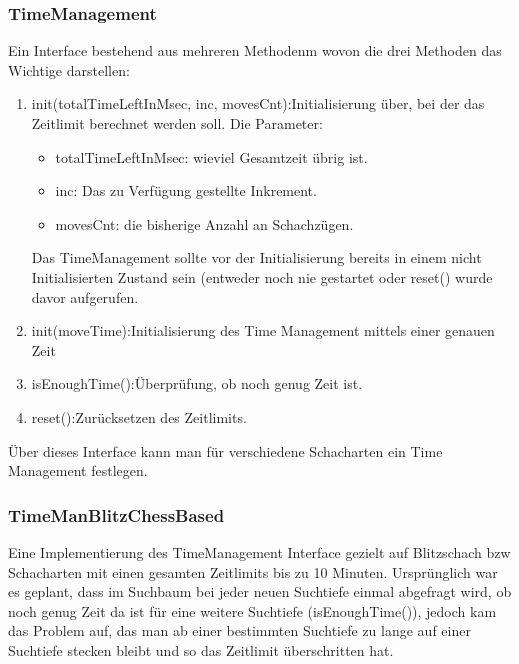 \subsubsection {TimeManagement}
Ein Interface bestehend aus mehreren Methodenm wovon die drei Methoden das Wichtige darstellen:
\begin{enumerate}
    \item{ init(totalTimeLeftInMsec, inc, movesCnt):\newline Initialisierung \"uber, bei der das Zeitlimit berechnet werden soll. \newline Die Parameter:
            \begin{itemize}
                \item{totalTimeLeftInMsec: wieviel Gesamtzeit übrig ist.}
                \item{inc: Das zu Verfügung gestellte Inkrement.}
                \item{movesCnt: die bisherige Anzahl an Schachzügen.}
            \end{itemize}
         Das TimeManagement sollte vor der Initialisierung bereits in einem nicht Initialisierten Zustand sein (entweder noch nie gestartet oder reset() wurde davor aufgerufen.}
    \item{ init(moveTime):\newline Initialisierung des Time Management mittels einer genauen Zeit}
    \item{ isEnoughTime():\newline Überprüfung, ob noch genug Zeit ist.}
    \item{ reset():\newline Zurücksetzen des Zeitlimits.}
\end{enumerate}
Über dieses Interface kann man für verschiedene Schacharten ein Time Management festlegen.\newline

\subsubsection{TimeManBlitzChessBased}
Eine Implementierung des TimeManagement Interface gezielt auf Blitzschach bzw Schacharten mit einen gesamten Zeitlimits bis zu 10 Minuten. \newline
Urspr\"unglich war es geplant, dass im Suchbaum bei jeder neuen Suchtiefe einmal abgefragt wird, ob noch genug Zeit da ist für eine weitere Suchtiefe (isEnoughTime()), jedoch kam das Problem auf, das man ab einer bestimmten Suchtiefe zu lange auf einer Suchtiefe stecken bleibt und so das Zeitlimit überschritten hat. 

